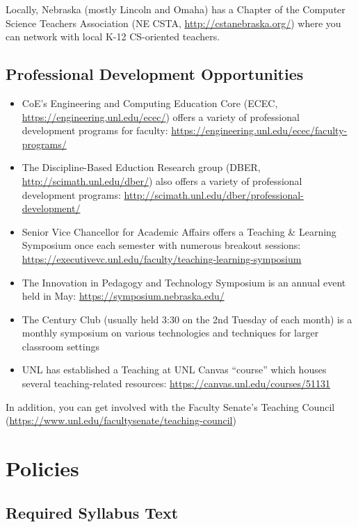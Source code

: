 \documentclass[12pt]{scrartcl}
\begin{document}
Locally, Nebraska (mostly Lincoln and Omaha) has a Chapter of the 
Computer Science Teachers Association (NE CSTA, 
\url{http://cstanebraska.org/}) where you can network with local
K-12 CS-oriented teachers.  

\subsection{Professional Development Opportunities}

\begin{itemize}
  \item CoE's Engineering and Computing Education Core (ECEC,
  \url{https://engineering.unl.edu/ecec/})   
  offers a variety of professional development programs for
  faculty: \url{https://engineering.unl.edu/ecec/faculty-programs/}
  \item The Discipline-Based Eduction Research group (DBER, \url{http://scimath.unl.edu/dber/}) also offers a variety of professional
  development programs: \url{http://scimath.unl.edu/dber/professional-development/}
  \item Senior Vice Chancellor for Academic Affairs offers a 
  Teaching \& Learning Symposium once each semester with numerous
  breakout sessions: \url{https://executivevc.unl.edu/faculty/teaching-learning-symposium}
  \item The Innovation in Pedagogy and Technology Symposium is an 
  annual event held in May: \url{https://symposium.nebraska.edu/}
  \item The Century Club (usually held 3:30 on the 2nd Tuesday of
  each month) is a monthly symposium on various technologies and
  techniques for larger classroom settings
  \item UNL has established a Teaching at UNL Canvas ``course''
  which houses several teaching-related resources: \url{https://canvas.unl.edu/courses/51131}
\end{itemize}

In addition, you can get involved with the Faculty Senate's
Teaching Council (\url{https://www.unl.edu/facultysenate/teaching-council})

\section{Policies}

\subsection{Required Syllabus Text}
\end{document}
